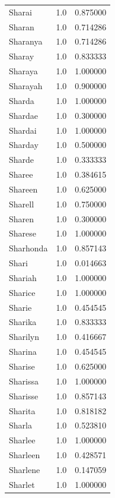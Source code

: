 \documentclass[
  letterpaper,
  DIV=11,
  numbers=noendperiod]{scrreprt}
\begin{document}
\begin{tabular}{lrr}
Sharai          &   1.0 &   0.875000 \\
Sharan          &   1.0 &   0.714286 \\
Sharanya        &   1.0 &   0.714286 \\
Sharay          &   1.0 &   0.833333 \\
Sharaya         &   1.0 &   1.000000 \\
Sharayah        &   1.0 &   0.900000 \\
Sharda          &   1.0 &   1.000000 \\
Shardae         &   1.0 &   0.300000 \\
Shardai         &   1.0 &   1.000000 \\
Sharday         &   1.0 &   0.500000 \\
Sharde          &   1.0 &   0.333333 \\
Sharee          &   1.0 &   0.384615 \\
Shareen         &   1.0 &   0.625000 \\
Sharell         &   1.0 &   0.750000 \\
Sharen          &   1.0 &   0.300000 \\
Sharese         &   1.0 &   1.000000 \\
Sharhonda       &   1.0 &   0.857143 \\
Shari           &   1.0 &   0.014663 \\
Shariah         &   1.0 &   1.000000 \\
Sharice         &   1.0 &   1.000000 \\
Sharie          &   1.0 &   0.454545 \\
Sharika         &   1.0 &   0.833333 \\
Sharilyn        &   1.0 &   0.416667 \\
Sharina         &   1.0 &   0.454545 \\
Sharise         &   1.0 &   0.625000 \\
Sharissa        &   1.0 &   1.000000 \\
Sharisse        &   1.0 &   0.857143 \\
Sharita         &   1.0 &   0.818182 \\
Sharla          &   1.0 &   0.523810 \\
Sharlee         &   1.0 &   1.000000 \\
Sharleen        &   1.0 &   0.428571 \\
Sharlene        &   1.0 &   0.147059 \\
Sharlet         &   1.0 &   1.000000 \\

\end{tabular}
\end{document}
